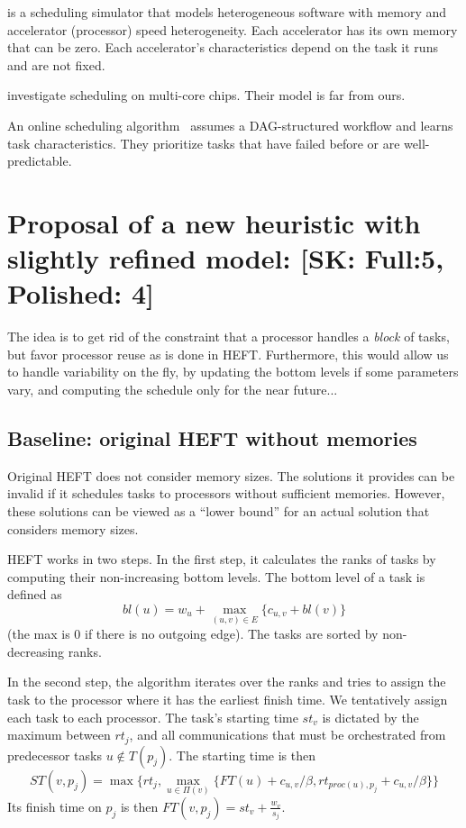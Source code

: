 \documentclass[conference]{IEEEtran}
\newcommand{\skug}[1]{{\color{blue}[SK: #1]}}
\begin{document}
    \cite{lutke2024hetsim} is a scheduling simulator that models heterogeneous software with memory and accelerator
    (processor) speed heterogeneity.
    Each accelerator has its own memory that can be zero.
    Each accelerator's characteristics depend on the task it runs and are not fixed.




    \cite{meng2018traffic} investigate scheduling on multi-core chips.
    Their model is far from ours.


    An online scheduling algorithm~\cite{Witt2018POS} assumes a DAG-structured workflow and learns task characteristics.
    They prioritize tasks that have failed before or are well-predictable.

    \section{Proposal of a new heuristic with slightly refined model: \skug{Full:5, Polished: 4}}

    The idea is to get rid of the constraint that a processor handles a {\em block} of tasks,
    but favor processor reuse as is done in HEFT.
    Furthermore, this would allow us to handle variability on the fly, by updating
    the bottom levels if some parameters vary, and computing the schedule
    only for the near future...

    \subsection{Baseline: original HEFT without memories}

    Original HEFT does not consider memory sizes.
    The solutions it provides can be invalid if it schedules tasks to processors without sufficient memories.
    However, these solutions can be viewed as a ``lower bound'' for an actual solution that considers memory sizes.

    HEFT works in two steps.
    In the first step, it calculates the ranks of tasks by computing their non-increasing bottom levels.
    The bottom level of a task is defined as
    $$bl(u) = w_u + \max_{(u,v)\in E} \{c_{u,v} + bl(v)\}$$
    (the max is 0 if there is no outgoing edge).
    The tasks are sorted by non-decreasing ranks.

    In the second step, the algorithm iterates over the ranks and tries to assign the task to the processor where it
    has the earliest finish time.
    We tentatively assign each task to each processor.
    The task's starting time $st_v$ is dictated by the maximum between $rt_j$, and all communications that
    must be orchestrated from predecessor tasks $u\notin T(p_j)$.
    The starting time is then
    \[ST(v, p_j) = \max{ \{rt_j, \max_{ u \in \Pi(v)}\{ FT(u)+ c_{u,v} / \beta , rt_{proc(u), p_j} + c_{u,v} / \beta  \} \} } \]
    Its finish time on $p_j$ is then
    $FT(v,p_j) = st_v + \frac{w_v}{s_j}$.
\end{document}
